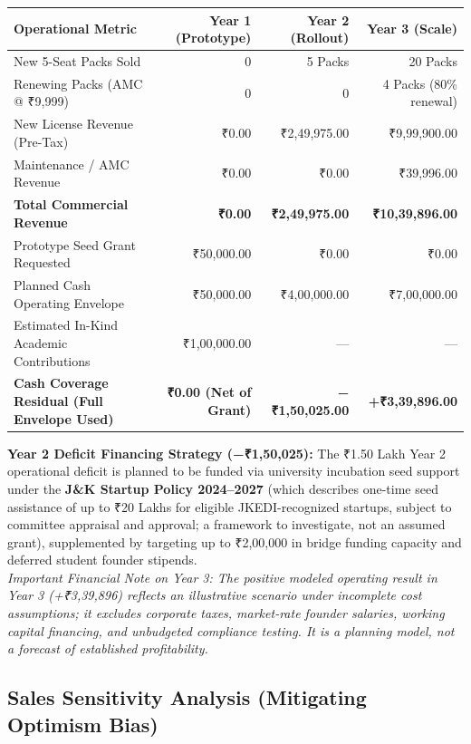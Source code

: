 \documentclass[11pt,a4paper]{article}
\begin{document}
\noindent
\begin{tabularx}{\textwidth}{|l|r|r|r|}
\hline
\textbf{Operational Metric} & \textbf{Year 1 (Prototype)} & \textbf{Year 2 (Rollout)} & \textbf{Year 3 (Scale)} \\
\hline
New 5-Seat Packs Sold & 0 & 5 Packs & 20 Packs \\
Renewing Packs (AMC @ ₹9,999) & 0 & 0 & 4 Packs (80\% renewal) \\
New License Revenue (Pre-Tax) & ₹0.00 & ₹2,49,975.00 & ₹9,99,900.00 \\
Maintenance / AMC Revenue & ₹0.00 & ₹0.00 & ₹39,996.00 \\
\hline
\textbf{Total Commercial Revenue} & \textbf{₹0.00} & \textbf{₹2,49,975.00} & \textbf{₹10,39,896.00} \\
Prototype Seed Grant Requested & ₹50,000.00 & ₹0.00 & ₹0.00 \\
Planned Cash Operating Envelope & ₹50,000.00 & ₹4,00,000.00 & ₹7,00,000.00 \\
Estimated In-Kind Academic Contributions & ₹1,00,000.00 & --- & --- \\
\hline
\textbf{Cash Coverage Residual (Full Envelope Used)} & \textbf{₹0.00 (Net of Grant)} & \textbf{−₹1,50,025.00} & \textbf{+₹3,39,896.00} \\
\hline
\end{tabularx}

\vspace{0.15cm}
\noindent\textbf{Year 2 Deficit Financing Strategy (−₹1,50,025):} The ₹1.50 Lakh Year 2 operational deficit is planned to be funded via university incubation seed support under the \textbf{J\&K Startup Policy 2024–2027} (which describes one-time seed assistance of up to ₹20 Lakhs for eligible JKEDI-recognized startups, subject to committee appraisal and approval; a framework to investigate, not an assumed grant), supplemented by targeting up to ₹2,00,000 in bridge funding capacity and deferred student founder stipends.\\
\noindent\textit{Important Financial Note on Year 3: The positive modeled operating result in Year 3 (+₹3,39,896) reflects an illustrative scenario under incomplete cost assumptions; it excludes corporate taxes, market-rate founder salaries, working capital financing, and unbudgeted compliance testing. It is a planning model, not a forecast of established profitability.}

\vspace{0.15cm}
\subsection{Sales Sensitivity Analysis (Mitigating Optimism Bias)}
\end{document}

